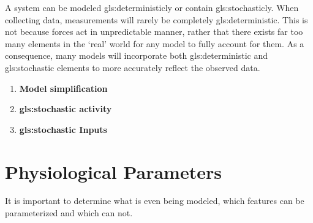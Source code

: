 A system can be modeled \gls{gls:deterministic}ly or contain \gls{gls:stochastic}ly. When collecting data, measurements will rarely be completely \gls{gls:deterministic}. This is not because forces act in unpredictable manner, rather that there exists far too many elements in the `real' world for any model to fully account for them. 
As a consequence, many models will incorporate both \gls{gls:deterministic} and \gls{gls:stochastic} elements to more accurately reflect the observed data.
\begin{enumerate}
    \item \textbf{Model simplification}
    \item \textbf{\Gls{gls:stochastic} activity}
    \item \textbf{\gls{gls:stochastic} Inputs}
\end{enumerate}



\newpage
\section{Physiological Parameters}
It is important to determine what is even being modeled, which features can be parameterized and which can not.





